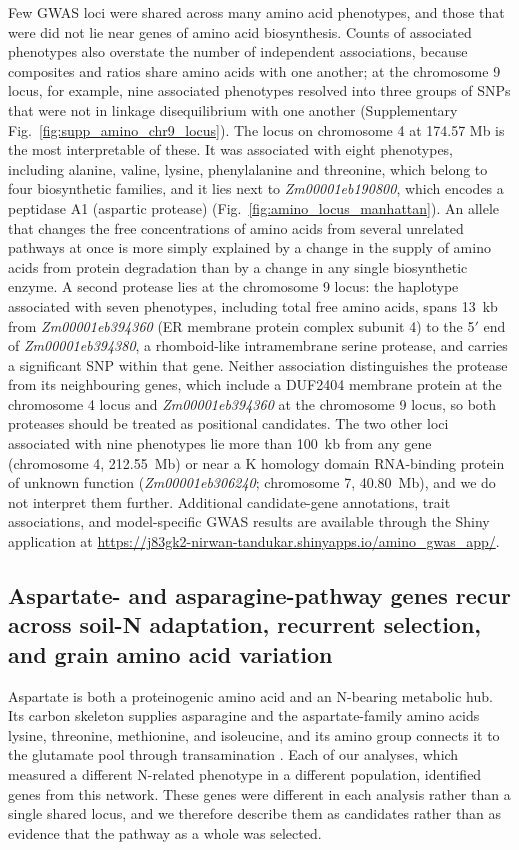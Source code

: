 Few GWAS loci were shared across many amino acid phenotypes, and those that were did not lie near genes of amino acid biosynthesis. Counts of associated phenotypes also overstate the number of independent associations, because composites and ratios share amino acids with one another; at the chromosome 9 locus, for example, nine associated phenotypes resolved into three groups of SNPs that were not in linkage disequilibrium with one another (Supplementary Fig.~\ref{fig:supp_amino_chr9_locus}). The locus on chromosome 4 at 174.57 Mb is the most interpretable of these. It was associated with eight phenotypes, including alanine, valine, lysine, phenylalanine and threonine, which belong to four biosynthetic families, and it lies next to \textit{Zm00001eb190800}, which encodes a peptidase A1 (aspartic protease) (Fig.~\ref{fig:amino_locus_manhattan}). An allele that changes the free concentrations of amino acids from several unrelated pathways at once is more simply explained by a change in the supply of amino acids from protein degradation than by a change in any single biosynthetic enzyme. A second protease lies at the chromosome 9 locus: the haplotype associated with seven phenotypes, including total free amino acids, spans 13~kb from \textit{Zm00001eb394360} (ER membrane protein complex subunit 4) to the 5$'$ end of \textit{Zm00001eb394380}, a rhomboid-like intramembrane serine protease, and carries a significant SNP within that gene. Neither association distinguishes the protease from its neighbouring genes, which include a DUF2404 membrane protein at the chromosome 4 locus and \textit{Zm00001eb394360} at the chromosome 9 locus, so both proteases should be treated as positional candidates. The two other loci associated with nine phenotypes lie more than 100~kb from any gene (chromosome 4, 212.55~Mb) or near a K homology domain RNA-binding protein of unknown function (\textit{Zm00001eb306240}; chromosome 7, 40.80~Mb), and we do not interpret them further. Additional candidate-gene annotations, trait associations, and model-specific GWAS results are available through the Shiny application at \url{https://j83gk2-nirwan-tandukar.shinyapps.io/amino_gwas_app/}.

\subsection{Aspartate- and asparagine-pathway genes recur across soil-N adaptation, recurrent selection, and grain amino acid variation}

Aspartate is both a proteinogenic amino acid and an N-bearing metabolic hub. Its carbon skeleton supplies asparagine and the aspartate-family amino acids lysine, threonine, methionine, and isoleucine, and its amino group connects it to the glutamate pool through transamination \citep{Han2021Aspartate,Wang2018AspSeeds,Viola2001AspartatePathway}. Each of our analyses, which measured a different N-related phenotype in a different population, identified genes from this network. These genes were different in each analysis rather than a single shared locus, and we therefore describe them as candidates rather than as evidence that the pathway as a whole was selected.


